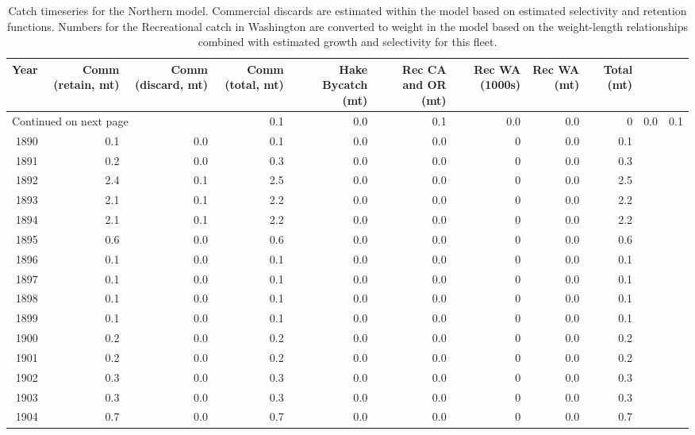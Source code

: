 \documentclass[12pt,]{article}
\begin{document}
\begin{longtable}{rrrrrrrrr}
\caption{Catch timeseries for the Northern model. Commercial discards are estimated within the model based on estimated selectivity and retention functions. Numbers for the Recreational catch in Washington are converted to weight in the model based on the weight-length relationships combined with estimated growth and selectivity for this fleet.} \\ 
  \hline
\multicolumn{1}{p{0.6in}}{\centering Year} & \multicolumn{1}{p{0.6in}}{\centering Comm (retain, mt)} & \multicolumn{1}{p{0.6in}}{\centering Comm (discard, mt)} & \multicolumn{1}{p{0.6in}}{\centering Comm (total, mt)} & \multicolumn{1}{p{0.6in}}{\centering Hake Bycatch (mt)} & \multicolumn{1}{p{0.6in}}{\centering Rec CA and OR (mt)} & \multicolumn{1}{p{0.6in}}{\centering Rec WA (1000s)} & \multicolumn{1}{p{0.6in}}{\centering Rec WA (mt)} & \multicolumn{1}{p{0.6in}}{\centering Total (mt)} \\ 
  \hline 
\endhead 
\hline 
\multicolumn{3}{l}{\footnotesize Continued on next page} 
\endfoot 
\endlastfoot 
 \hline
1889 & 0.1 & 0.0 & 0.1 & 0.0 & 0.0 & 0 & 0.0 & 0.1 \\ 
  1890 & 0.1 & 0.0 & 0.1 & 0.0 & 0.0 & 0 & 0.0 & 0.1 \\ 
  1891 & 0.2 & 0.0 & 0.3 & 0.0 & 0.0 & 0 & 0.0 & 0.3 \\ 
  1892 & 2.4 & 0.1 & 2.5 & 0.0 & 0.0 & 0 & 0.0 & 2.5 \\ 
  1893 & 2.1 & 0.1 & 2.2 & 0.0 & 0.0 & 0 & 0.0 & 2.2 \\ 
  1894 & 2.1 & 0.1 & 2.2 & 0.0 & 0.0 & 0 & 0.0 & 2.2 \\ 
  1895 & 0.6 & 0.0 & 0.6 & 0.0 & 0.0 & 0 & 0.0 & 0.6 \\ 
  1896 & 0.1 & 0.0 & 0.1 & 0.0 & 0.0 & 0 & 0.0 & 0.1 \\ 
  1897 & 0.1 & 0.0 & 0.1 & 0.0 & 0.0 & 0 & 0.0 & 0.1 \\ 
  1898 & 0.1 & 0.0 & 0.1 & 0.0 & 0.0 & 0 & 0.0 & 0.1 \\ 
  1899 & 0.1 & 0.0 & 0.1 & 0.0 & 0.0 & 0 & 0.0 & 0.1 \\ 
  1900 & 0.2 & 0.0 & 0.2 & 0.0 & 0.0 & 0 & 0.0 & 0.2 \\ 
  1901 & 0.2 & 0.0 & 0.2 & 0.0 & 0.0 & 0 & 0.0 & 0.2 \\ 
  1902 & 0.3 & 0.0 & 0.3 & 0.0 & 0.0 & 0 & 0.0 & 0.3 \\ 
  1903 & 0.3 & 0.0 & 0.3 & 0.0 & 0.0 & 0 & 0.0 & 0.3 \\ 
  1904 & 0.7 & 0.0 & 0.7 & 0.0 & 0.0 & 0 & 0.0 & 0.7 \\ 

\end{longtable}
\end{document}
